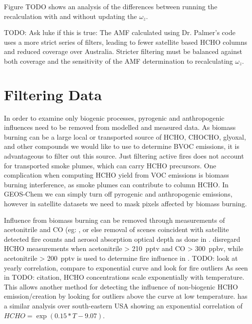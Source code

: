     Figure TODO shows an analysis of the differences between running the recalculation with and without updating the $\omega_z$.
    
    
    TODO: Ask luke if this is true:
    The AMF calculated using Dr. Palmer's code uses a more strict series of filters, leading to fewer satellite based HCHO columns and reduced coverage over Australia.
    Stricter filtering must be balanced against both coverage and the sensitivity of the AMF determination to recalculating $\omega_z$.
  

\section{Filtering Data}
  \label{Model:Filter}
  
  In order to examine only biogenic processes, pyrogenic and anthropogenic influences need to be removed from modelled and measured data.
  As biomass burning can be a large local or transported source of HCHO, CHOCHO, glyoxal, and other compounds we would like to use to determine BVOC emissions, it is advantageous to filter out this source.
  Just filtering active fires does not account for transported smoke plumes, which can carry HCHO precursors.
  One complication when computing HCHO yield from VOC emissions is biomass burning interference, as smoke plumes can contribute to column HCHO.
  In GEOS-Chem we can simply turn off pyrogenic and anthropogenic emissions, however in satellite datasets we need to mask pixels affected by biomass burning.
  
  Influence from biomass burning can be removed through measurements of acetonitrile and CO (eg: \parencite{Wolfe2016, Miller2017}, or else removal of scenes coincident with satellite detected fire counts and aerosol absorption optical depth as done in \textcite{Marais2014}.
  \textcite{Wolfe2016} disregard HCHO measurements when acetonitrile > 210~pptv and CO > 300~ppbv, while acetonitrile > 200~pptv is used to determine fire influence in \textcite{Miller2017}.
  TODO: look at yearly correlation, compare to exponential curve and look for fire outliers
  As seen in TODO: citation, HCHO concentrations scale exponentially with temperature.
  This allows another method for detecting the influence of non-biogenic HCHO emission/creation by looking for outliers above the curve at low temperature.
  \textcite{Zhu2013_poster} has a similar analysis over south-eastern USA showing an exponential correlation of ${HCHO} = \exp(0.15*{T}-9.07)$.
  
